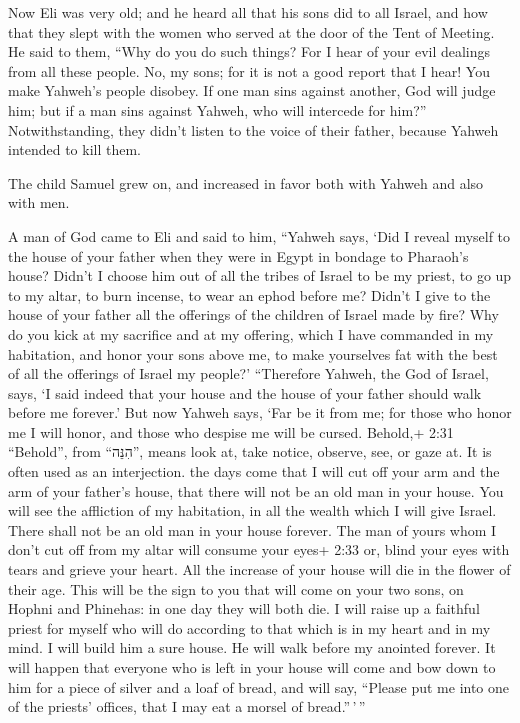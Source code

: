  Now Eli was very old; and he heard all that his sons did
to all Israel, and how that they slept with the women who served at the
door of the Tent of Meeting.  He said to them, ``Why do you
do such things? For I hear of your evil dealings from all these people.
 No, my sons; for it is not a good report that I hear! You
make Yahweh's people disobey.  If one man sins against
another, God will judge him; but if a man sins against Yahweh, who will
intercede for him?'' Notwithstanding, they didn't listen to the voice of
their father, because Yahweh intended to kill them.

 The child Samuel grew on, and increased in favor both with
Yahweh and also with men.

 A man of God came to Eli and said to him, ``Yahweh says,
`Did I reveal myself to the house of your father when they were in Egypt
in bondage to Pharaoh's house?  Didn't I choose him out of
all the tribes of Israel to be my priest, to go up to my altar, to burn
incense, to wear an ephod before me? Didn't I give to the house of your
father all the offerings of the children of Israel made by fire?
 Why do you kick at my sacrifice and at my offering, which
I have commanded in my habitation, and honor your sons above me, to make
yourselves fat with the best of all the offerings of Israel my people?'
 ``Therefore Yahweh, the God of Israel, says, `I said
indeed that your house and the house of your father should walk before
me forever.' But now Yahweh says, `Far be it from me; for those who
honor me I will honor, and those who despise me will be cursed.
 Behold,+ 2:31 ``Behold'', from ``הִנֵּה'', means look at,
take notice, observe, see, or gaze at. It is often used as an
interjection. the days come that I will cut off your arm and the arm of
your father's house, that there will not be an old man in your house.
 You will see the affliction of my habitation, in all the
wealth which I will give Israel. There shall not be an old man in your
house forever.  The man of yours whom I don't cut off from
my altar will consume your eyes+ 2:33 or, blind your eyes with tears and
grieve your heart. All the increase of your house will die in the flower
of their age.  This will be the sign to you that will come
on your two sons, on Hophni and Phinehas: in one day they will both die.
 I will raise up a faithful priest for myself who will do
according to that which is in my heart and in my mind. I will build him
a sure house. He will walk before my anointed forever.  It
will happen that everyone who is left in your house will come and bow
down to him for a piece of silver and a loaf of bread, and will say,
``Please put me into one of the priests' offices, that I may eat a
morsel of bread.''\,'\,''

